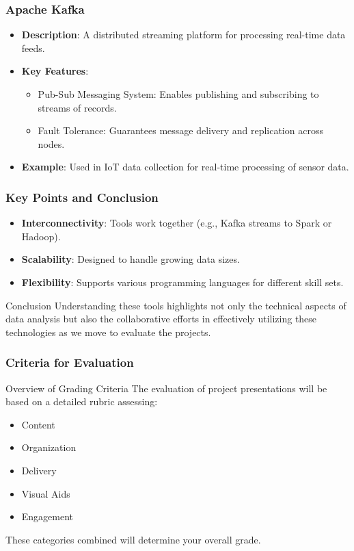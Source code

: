\documentclass[aspectratio=169]{beamer}
\begin{document}
\begin{frame}[fragile]
    \frametitle{Apache Kafka}
    \begin{itemize}
        \item \textbf{Description}: A distributed streaming platform for processing real-time data feeds.
        \item \textbf{Key Features}:
        \begin{itemize}
            \item Pub-Sub Messaging System: Enables publishing and subscribing to streams of records.
            \item Fault Tolerance: Guarantees message delivery and replication across nodes.
        \end{itemize}
        \item \textbf{Example}: Used in IoT data collection for real-time processing of sensor data.
    \end{itemize}
\end{frame}

\begin{frame}[fragile]
    \frametitle{Key Points and Conclusion}
    \begin{itemize}
        \item \textbf{Interconnectivity}: Tools work together (e.g., Kafka streams to Spark or Hadoop).
        \item \textbf{Scalability}: Designed to handle growing data sizes.
        \item \textbf{Flexibility}: Supports various programming languages for different skill sets.
    \end{itemize}
    \begin{block}{Conclusion}
        Understanding these tools highlights not only the technical aspects of data analysis but also the collaborative efforts in effectively utilizing these technologies as we move to evaluate the projects.
    \end{block}
\end{frame}

\begin{frame}[fragile]
    \frametitle{Criteria for Evaluation}
    \begin{block}{Overview of Grading Criteria}
        The evaluation of project presentations will be based on a detailed rubric assessing:
        \begin{itemize}
            \item Content
            \item Organization
            \item Delivery
            \item Visual Aids
            \item Engagement
        \end{itemize}
        These categories combined will determine your overall grade.
    \end{block}
\end{frame}
\end{document}
